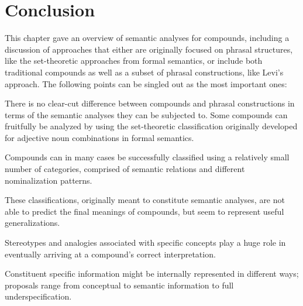 



\section{Conclusion}
\label{sec:sem-conclusion}

This chapter gave an overview of semantic analyses for compounds,
including a discussion of approaches that either are originally focused
on phrasal structures, like the set-theoretic approaches from formal
semantics, or include both traditional compounds as well as a subset
of phrasal constructions, like Levi's approach. The following points
can be singled out as the most important ones:
\begin{compactenum}
\item There is no clear-cut difference between compounds and phrasal
  constructions in terms of the semantic analyses they can be
  subjected to. Some compounds can fruitfully be analyzed by using
  the set-theoretic classification originally developed for adjective
  noun combinations in formal semantics.
\item Compounds can in many cases be successfully classified using a
  relatively small number of categories, comprised of semantic
  relations and different nominalization patterns.
\item These classifications, originally meant to constitute semantic
  analyses, are not able to predict the final meanings of compounds,
  but seem to represent useful generalizations.
\item Stereotypes and analogies associated with specific concepts play
  a huge role in eventually arriving at a compound's correct interpretation.
\item Constituent specific information might be internally represented
  in different ways; proposals range from conceptual to semantic
  information to full underspecification. 
\end{compactenum}


